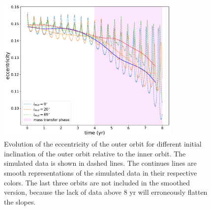 \begin{figure}[H]
    \centering
    \includegraphics[width=0.8\textwidth]{Thesis/graphs/inclination_case/inclination_outer_ecc.pdf}
    \caption{Evolution of the eccentricity of the outer orbit for different initial inclination of the outer orbit relative to the inner orbit. The simulated data is shown in dashed lines. The continues lines are smooth representations of the simulated data in their respective colors. The last three orbits are not included in the smoothed version, because the lack of data above $8$ yr will erroneously flatten the slopes.}
    \label{fig:inclination_outer_ecc}
\end{figure}
